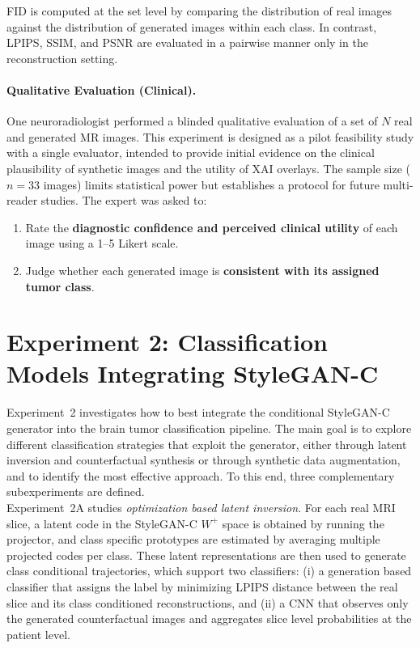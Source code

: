 FID is computed at the set level by comparing the distribution of real images against the distribution of generated images within each class. In contrast, LPIPS, SSIM, and PSNR are evaluated in a pairwise manner only in the reconstruction setting.


\paragraph{Qualitative Evaluation (Clinical).}
One neuroradiologist performed a blinded qualitative evaluation of a set of \(N\) real and generated MR images. This experiment is designed as a pilot feasibility study with a single evaluator, intended to provide initial evidence on the clinical plausibility of synthetic images and the utility of XAI overlays. The sample size ($n=33$ images) limits statistical power but establishes a protocol for future multi-reader studies. The expert was asked to:
\begin{enumerate}
    \item Rate the \textbf{diagnostic confidence and perceived clinical utility} of each image using a 1--5 Likert scale.
    \item Judge whether each generated image is \textbf{consistent with its assigned tumor class}.
\end{enumerate}




\newpage

\section{Experiment 2: Classification Models Integrating StyleGAN-C}
\label{sec:exp2_overview}

Experiment~2 investigates how to best integrate the conditional StyleGAN-C generator into the brain tumor classification pipeline. The main goal is to explore different classification strategies that exploit the generator, either through latent inversion and counterfactual synthesis or through synthetic data augmentation, and to identify the most effective approach. To this end, three complementary subexperiments are defined.\\

Experiment~2A studies \emph{optimization based latent inversion}. For each real MRI slice, a latent code in the StyleGAN-C $W^+$ space is obtained by running the projector, and class specific prototypes are estimated by averaging multiple projected codes per class. These latent representations are then used to generate class conditional trajectories, which support two classifiers: (i) a generation based classifier that assigns the label by minimizing LPIPS distance between the real slice and its class conditioned reconstructions, and (ii) a CNN that observes only the generated counterfactual images and aggregates slice level probabilities at the patient level.\\

